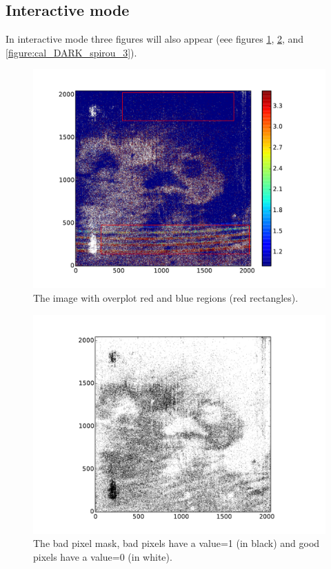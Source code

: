 \subsection{Interactive mode}

\noindent In interactive mode three figures will also appear (eee figures \ref{figure:cal_DARK_spirou_1}, \ref{figure:cal_DARK_spirou_2}, and \ref{figure:cal_DARK_spirou_3}).

\begin{figure}
\begin{center}
\includegraphics[width=.8\textwidth]{figures/cal_DARK_spirou_1.pdf}
\caption{The image with overplot red and blue regions (red rectangles). \label{figure:cal_DARK_spirou_1}}
\end{center}
\end{figure}

\begin{figure}
\begin{center}
\includegraphics[width=.8\textwidth]{figures/cal_DARK_spirou_2.pdf}
\caption{The bad pixel mask, bad pixels have a value=1 (in black) and good pixels have a value=0 (in white). \label{figure:cal_DARK_spirou_2}}
\end{center}
\end{figure}

